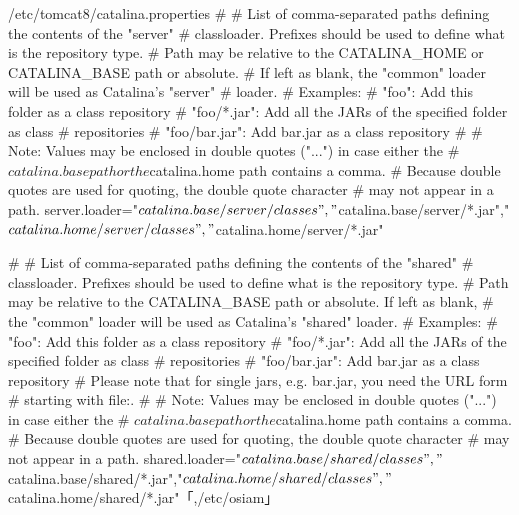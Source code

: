 \documentclass{tarentanleitung}
\begin{document}
\begin{lstdump}{/etc/tomcat8/catalina.properties}
#
# List of comma-separated paths defining the contents of the "server"
# classloader. Prefixes should be used to define what is the repository type.
# Path may be relative to the CATALINA_HOME or CATALINA_BASE path or absolute.
# If left as blank, the "common" loader will be used as Catalina's "server"
# loader.
# Examples:
#     "foo": Add this folder as a class repository
#     "foo/*.jar": Add all the JARs of the specified folder as class
#                  repositories
#     "foo/bar.jar": Add bar.jar as a class repository
#
# Note: Values may be enclosed in double quotes ("...") in case either the
#       ${catalina.base} path or the ${catalina.home} path contains a comma.
#       Because double quotes are used for quoting, the double quote character
#       may not appear in a path.
server.loader="${catalina.base}/server/classes","${catalina.base}/server/*.jar","${catalina.home}/server/classes","${catalina.home}/server/*.jar"

#
# List of comma-separated paths defining the contents of the "shared"
# classloader. Prefixes should be used to define what is the repository type.
# Path may be relative to the CATALINA_BASE path or absolute. If left as blank,
# the "common" loader will be used as Catalina's "shared" loader.
# Examples:
#     "foo": Add this folder as a class repository
#     "foo/*.jar": Add all the JARs of the specified folder as class
#                  repositories
#     "foo/bar.jar": Add bar.jar as a class repository
# Please note that for single jars, e.g. bar.jar, you need the URL form
# starting with file:.
#
# Note: Values may be enclosed in double quotes ("...") in case either the
#       ${catalina.base} path or the ${catalina.home} path contains a comma.
#       Because double quotes are used for quoting, the double quote character
#       may not appear in a path.
shared.loader="${catalina.base}/shared/classes","${catalina.base}/shared/*.jar","${catalina.home}/shared/classes","${catalina.home}/shared/*.jar"「,/etc/osiam」


\end{lstdump}
\end{document}
